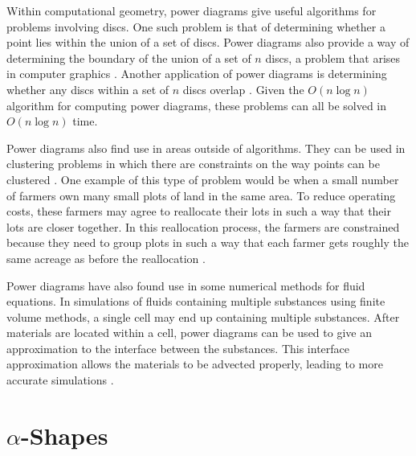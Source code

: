 \documentclass[a4paper]{article}
\begin{document}
Within computational geometry, power diagrams give useful algorithms for problems involving discs. One such problem is that of determining whether a point
lies within the union of a set of discs. Power diagrams also provide a way of determining the boundary of the union of a set of $n$ discs, a problem
that arises in computer graphics \cite{imai_power}. Another application of power diagrams is determining whether any discs within a set of $n$ discs overlap
\cite{aurenhammer_discs}. Given the $O(n \log n)$ algorithm for computing power diagrams, these problems can all be solved in $O(n \log n)$ time.

Power diagrams also find use in areas outside of algorithms. They can be used in clustering problems in which there are constraints on the way points
can be clustered \cite{brieden_clustering}. One example of this type of problem would be when a small number of farmers own many small plots of land
in the same area. To reduce operating costs, these farmers may agree to reallocate their lots in such a way that their lots are closer together. In
this reallocation process, the farmers are constrained because they need to group plots in such a way that each farmer gets roughly the same acreage
as before the reallocation \cite{brieden_farmland}.


Power diagrams have also found use in some numerical methods for fluid equations. In simulations of fluids containing multiple substances using finite
volume methods, a single cell may end up containing multiple substances. After materials are located within a cell, power diagrams can be used to give an approximation to the
interface between the substances. This interface approximation allows the materials to be advected properly, leading to more accurate simulations
\cite{fluids}.

\section{$\alpha$-Shapes}
\end{document}
